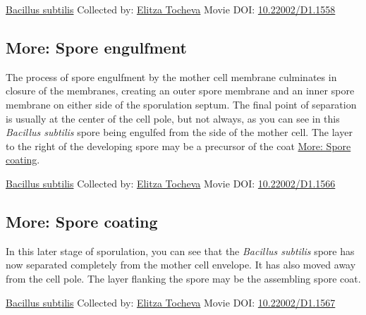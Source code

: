\documentclass[]{tufte-book}
\begin{document}
\hypertarget{htmlwidget-8a80a08f83369498d072}{}

\label{fig:8-6}\protect\hyperlink{tree}{Bacillus subtilis} Collected by: \protect\hyperlink{elitza_tocheva}{Elitza Tocheva} Movie DOI: \href{https://doi.org/10.22002/D1.1558}{10.22002/D1.1558}

\hypertarget{Spore_engulfment}{%
\subsection*{More: Spore engulfment}\label{Spore_engulfment}}

The process of spore engulfment by the mother cell membrane culminates in closure of the membranes, creating an outer spore membrane and an inner spore membrane on either side of the sporulation septum. The final point of separation is usually at the center of the cell pole, but not always, as you can see in this \emph{Bacillus subtilis} spore being engulfed from the side of the mother cell. The layer to the right of the developing spore may be a precursor of the coat \protect\hyperlink{Spore_coating}{More: Spore coating}.



\hypertarget{htmlwidget-241ebb3221d4dbfdeb12}{}

\label{fig:8-6a}\protect\hyperlink{tree}{Bacillus subtilis} Collected by: \protect\hyperlink{elitza_tocheva}{Elitza Tocheva} Movie DOI: \href{https://doi.org/10.22002/D1.1566}{10.22002/D1.1566}

\hypertarget{Spore_coating}{%
\subsection*{More: Spore coating}\label{Spore_coating}}

In this later stage of sporulation, you can see that the \emph{Bacillus subtilis} spore has now separated completely from the mother cell envelope. It has also moved away from the cell pole. The layer flanking the spore may be the assembling spore coat.



\hypertarget{htmlwidget-90dd4560a5af82e2d55b}{}

\label{fig:8-6b}\protect\hyperlink{tree}{Bacillus subtilis} Collected by: \protect\hyperlink{elitza_tocheva}{Elitza Tocheva} Movie DOI: \href{https://doi.org/10.22002/D1.1567}{10.22002/D1.1567}
\end{document}
